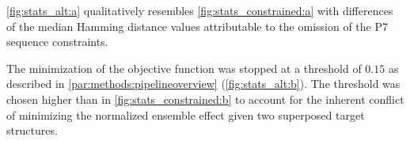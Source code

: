 \documentclass[../../master.tex]{subfiles}
\begin{document}
\autoref{fig:stats_alt:a} qualitatively resembles \autoref{fig:stats_constrained:a} with differences of the median Hamming distance values attributable to the omission of the P7 sequence constraints.

The minimization of the objective function was stopped at a threshold of $0.15$ as described in \autoref{par:methods:pipelineoverview} (\autoref{fig:stats_alt:b}).
The threshold was chosen higher than in \autoref{fig:stats_constrained:b} to account for the inherent conflict of minimizing the normalized ensemble effect given two superposed target structures. 


\begin{figure}[!ht]
	\centering
	\begin{subfigure}[t]{0.2\textwidth}
		\centering

\end{subfigure}
\end{figure}
\end{document}
